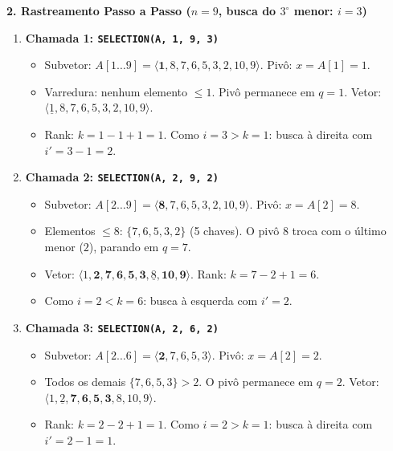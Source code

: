 \documentclass[10pt,a4paper]{article}
\newcommand{\topico}[1]{\smallskip\noindent\textbf{\color{azul}#1}\par}
\begin{document}
\topico{2. Rastreamento Passo a Passo ($n = 9$, busca do $3^\circ$ menor: $i = 3$)}

\begin{enumerate}
    \setlength{\itemsep}{2pt}
    \item \textbf{Chamada 1: \texttt{SELECTION(A, 1, 9, 3)}}
    \begin{itemize}
        \setlength{\itemsep}{0pt}
        \item Subvetor: $A[1 \dots 9] = \langle \mathbf{1}, 8, 7, 6, 5, 3, 2, 10, 9 \rangle$. Pivô: $x = A[1] = 1$.
        \item Varredura: nenhum elemento $\le 1$. Pivô permanece em $q = 1$. Vetor: $\langle \underline{1}, 8, 7, 6, 5, 3, 2, 10, 9 \rangle$.
        \item Rank: $k = 1 - 1 + 1 = 1$. Como $i = 3 > k = 1$: busca à direita com $i' = 3 - 1 = 2$.
    \end{itemize}

    \item \textbf{Chamada 2: \texttt{SELECTION(A, 2, 9, 2)}}
    \begin{itemize}
        \setlength{\itemsep}{0pt}
        \item Subvetor: $A[2 \dots 9] = \langle \mathbf{8}, 7, 6, 5, 3, 2, 10, 9 \rangle$. Pivô: $x = A[2] = 8$.
        \item Elementos $\le 8$: $\{7, 6, 5, 3, 2\}$ (5 chaves). O pivô $8$ troca com o último menor ($2$), parando em $q = 7$.
        \item Vetor: $\langle 1, \mathbf{2, 7, 6, 5, 3}, \underline{8}, \mathbf{10, 9} \rangle$. Rank: $k = 7 - 2 + 1 = 6$.
        \item Como $i = 2 < k = 6$: busca à esquerda com $i' = 2$.
    \end{itemize}

    \item \textbf{Chamada 3: \texttt{SELECTION(A, 2, 6, 2)}}
    \begin{itemize}
        \setlength{\itemsep}{0pt}
        \item Subvetor: $A[2 \dots 6] = \langle \mathbf{2}, 7, 6, 5, 3 \rangle$. Pivô: $x = A[2] = 2$.
        \item Todos os demais $\{7, 6, 5, 3\} > 2$. O pivô permanece em $q = 2$. Vetor: $\langle 1, \underline{2}, \mathbf{7, 6, 5, 3}, 8, 10, 9 \rangle$.
        \item Rank: $k = 2 - 2 + 1 = 1$. Como $i = 2 > k = 1$: busca à direita com $i' = 2 - 1 = 1$.
    \end{itemize}


\end{enumerate}
\end{document}
